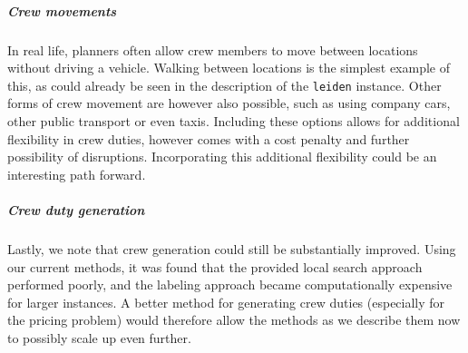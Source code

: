 \documentclass[]{article}
\begin{document}
\subparagraph{Crew movements}
In real life, planners often allow crew members to move between locations without driving a vehicle. Walking between locations is the simplest example of this, as could already be seen in the description of the \texttt{leiden} instance. Other forms of crew movement are however also possible, such as using company cars, other public transport or even taxis. Including these options allows for additional flexibility in crew duties, however comes with a cost penalty and further possibility of disruptions. Incorporating this additional flexibility could be an interesting path forward.

\subparagraph{Crew duty generation}
Lastly, we note that crew generation could still be substantially improved. Using our current methods, it was found that the provided local search approach performed poorly, and the labeling approach became computationally expensive for larger instances. A better method for generating crew duties (especially for the pricing problem) would therefore allow the methods as we describe them now to possibly scale up even further. 

\pagebreak

\printbibliography
\end{document}
